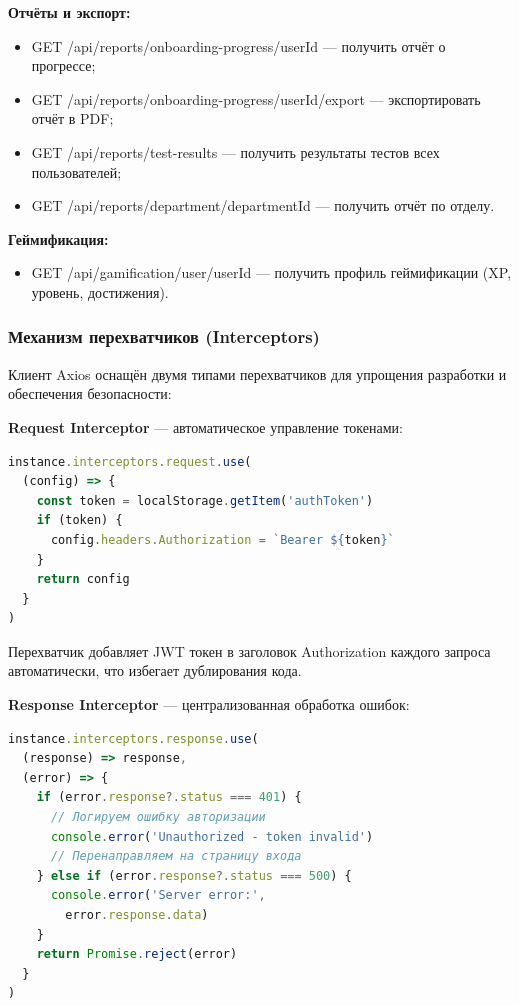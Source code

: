 \textbf{Отчёты и экспорт:}
\begin{itemize}
    \item GET /api/reports/onboarding-progress/{userId} --- получить отчёт о прогрессе;
    \item GET /api/reports/onboarding-progress/{userId}/export --- экспортировать отчёт в PDF;
    \item GET /api/reports/test-results --- получить результаты тестов всех пользователей;
    \item GET /api/reports/department/{departmentId} --- получить отчёт по отделу.
\end{itemize}

\textbf{Геймификация:}
\begin{itemize}
    \item GET /api/gamification/user/{userId} --- получить профиль геймификации (XP, уровень, достижения).
\end{itemize}

\subsubsection{Механизм перехватчиков (Interceptors)}

Клиент Axios оснащён двумя типами перехватчиков для упрощения разработки и обеспечения безопасности:

\textbf{Request Interceptor} --- автоматическое управление токенами:
\begin{lstlisting}[language=JavaScript, basicstyle=\ttfamily\small]
instance.interceptors.request.use(
  (config) => {
    const token = localStorage.getItem('authToken')
    if (token) {
      config.headers.Authorization = `Bearer ${token}`
    }
    return config
  }
)
\end{lstlisting}

Перехватчик добавляет JWT токен в заголовок Authorization каждого запроса автоматически, что избегает дублирования кода.

\textbf{Response Interceptor} --- централизованная обработка ошибок:
\begin{lstlisting}[language=JavaScript, basicstyle=\ttfamily\small]
instance.interceptors.response.use(
  (response) => response,
  (error) => {
    if (error.response?.status === 401) {
      // Логируем ошибку авторизации
      console.error('Unauthorized - token invalid')
      // Перенаправляем на страницу входа
    } else if (error.response?.status === 500) {
      console.error('Server error:', 
        error.response.data)
    }
    return Promise.reject(error)
  }
)
\end{lstlisting}

